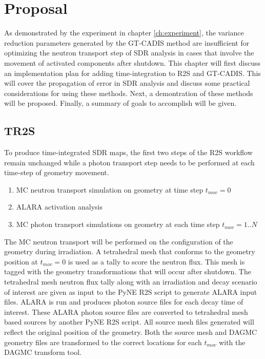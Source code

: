 
\chapter{Proposal}\label{ch:proposal}

As demonstrated by the experiment in chapter \ref{ch:experiment},  the variance
reduction parameters generated by the GT-CADIS method are insufficient for
optimizing the neutron transport step of SDR analysis in cases that involve the movement 
of activated components after shutdown.  
This chapter will first discuss an implementation plan for adding
time-integration to R2S and GT-CADIS.  This will cover the propagation of error
in SDR analysis and discuss some practical considerations for
using these methods. 
Next, a demontration of these methods will be proposed.
Finally, a summary of goals to accomplish will be given.

\section{TR2S}\label{sec:tr2s}
To produce time-integrated SDR maps, the
first two steps of the R2S workflow remain unchanged
while a photon transport step needs to be performed at each time-step of
geometry movement.
\begin{enumerate}
	\item{MC neutron transport simulation on geometry at time step $t_{mov}=0$}
	\item{ALARA activation analysis} 
	\item{MC photon transport simulations on geometry at each time step $t_{mov}=1..N$}
\end{enumerate}
The MC neutron transport will be performed on the configuration of the geometry 
during irradiation.
A tetrahedral mesh that conforms to
the geometry position at $t_{mov}=0$ is used as a tally to score the neutron flux.
This mesh is tagged with the geometry transformations that will occur after
shutdown.  The tetrahedral mesh neutron flux tally along with an irradiation and decay
scenario of interest are given as input to the PyNE R2S
script to generate ALARA input files.  ALARA is run and produces photon source
files for each decay time of interest.  These ALARA photon source files are
converted to tetrahedral mesh based sources by another PyNE R2S script.  All
source mesh files generated will reflect the original position of the geometry.
Both the source mesh and DAGMC geometry files are transformed to the 
correct locations for each $t_{mov}$ with the DAGMC transform tool.


